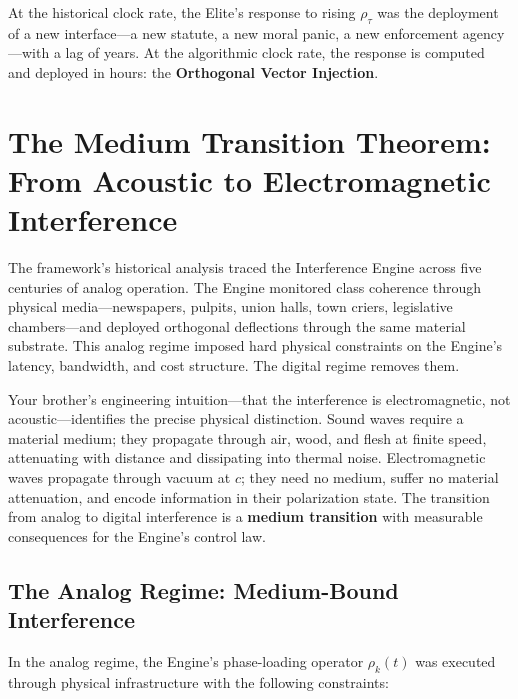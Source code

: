 At the historical clock rate, the Elite's response to rising $\rho_{\tau}$ was the deployment of a new interface---a new statute, a new moral panic, a new enforcement agency---with a lag of years. At the algorithmic clock rate, the response is computed and deployed in hours: the \textbf{Orthogonal Vector Injection}.

\section{The Medium Transition Theorem: From Acoustic to Electromagnetic Interference}
\label{sec:medium_transition}

The framework's historical analysis traced the Interference Engine across five centuries of analog operation. The Engine monitored class coherence through physical media---newspapers, pulpits, union halls, town criers, legislative chambers---and deployed orthogonal deflections through the same material substrate. This analog regime imposed hard physical constraints on the Engine's latency, bandwidth, and cost structure. The digital regime removes them.

Your brother's engineering intuition---that the interference is electromagnetic, not acoustic---identifies the precise physical distinction. Sound waves require a material medium; they propagate through air, wood, and flesh at finite speed, attenuating with distance and dissipating into thermal noise. Electromagnetic waves propagate through vacuum at $c$; they need no medium, suffer no material attenuation, and encode information in their polarization state. The transition from analog to digital interference is a \textbf{medium transition} with measurable consequences for the Engine's control law.

\subsection{The Analog Regime: Medium-Bound Interference}

In the analog regime, the Engine's phase-loading operator $\rho_k(t)$ was executed through physical infrastructure with the following constraints:

